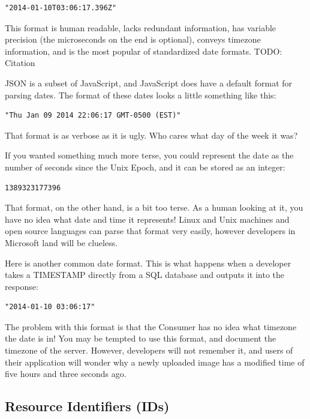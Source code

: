 \documentclass{book}
\begin{document}
\begin{verbatim}
"2014-01-10T03:06:17.396Z"
\end{verbatim}

This format is human readable, lacks redundant information, has variable precision (the microseconds on the end is optional), conveys timezone information, and is the most popular of standardized date formats. TODO: Citation

JSON is a subset of JavaScript, and JavaScript does have a default format for parsing dates. The format of these dates looks a little something like this:

\begin{verbatim}
"Thu Jan 09 2014 22:06:17 GMT-0500 (EST)"
\end{verbatim}

That format is as verbose as it is ugly. Who cares what day of the week it was?

If you wanted something much more terse, you could represent the date as the number of seconds since the Unix Epoch, and it can be stored as an integer:

\begin{verbatim}
1389323177396
\end{verbatim}

That format, on the other hand, is a bit too terse. As a human looking at it, you have no idea what date and time it represents! Linux and Unix machines and open source languages can parse that format very easily, however developers in Microsoft land will be clueless.

Here is another common date format. This is what happens when a developer takes a TIMESTAMP directly from a SQL database and outputs it into the response:

\begin{verbatim}
"2014-01-10 03:06:17"
\end{verbatim}

The problem with this format is that the Consumer has no idea what timezone the date is in! You may be tempted to use this format, and document the timezone of the server. However, developers will not remember it, and users of their application will wonder why a newly uploaded image has a modified time of five hours and three seconds ago.

\subsection{Resource Identifiers (IDs)}
\end{document}
